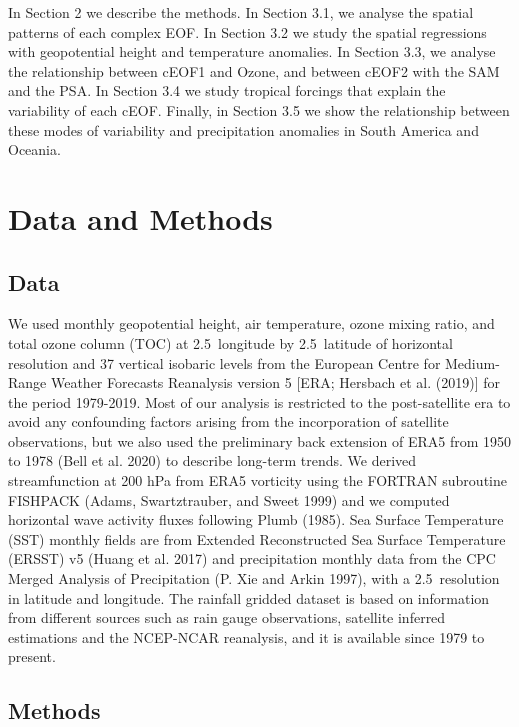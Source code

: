 \documentclass[smallextended]{svjour3}       %
\begin{document}
In Section 2 we describe the methods.
In Section 3.1, we analyse the spatial patterns of each complex EOF.
In Section 3.2 we study the spatial regressions with geopotential height and temperature anomalies.
In Section 3.3, we analyse the relationship between cEOF1 and Ozone, and between cEOF2 with the SAM and the PSA.
In Section 3.4 we study tropical forcings that explain the variability of each cEOF.
Finally, in Section 3.5 we show the relationship between these modes of variability and precipitation anomalies in South America and Oceania.

\hypertarget{methods}{%
\section{Data and Methods}\label{methods}}

\hypertarget{data}{%
\subsection{Data}\label{data}}

We used monthly geopotential height, air temperature, ozone mixing ratio, and total ozone column (TOC) at 2.5\degree~longitude by 2.5\degree~latitude of horizontal resolution and 37 vertical isobaric levels from the European Centre for Medium-Range Weather Forecasts Reanalysis version 5 {[}ERA; Hersbach et al. (2019){]} for the period 1979-2019.
Most of our analysis is restricted to the post-satellite era to avoid any confounding factors arising from the incorporation of satellite observations, but we also used the preliminary back extension of ERA5 from 1950 to 1978 (Bell et al. 2020) to describe long-term trends.
We derived streamfunction at 200 hPa from ERA5 vorticity using the FORTRAN subroutine FISHPACK (Adams, Swartztrauber, and Sweet 1999) and we computed horizontal wave activity fluxes following Plumb (1985).
Sea Surface Temperature (SST) monthly fields are from Extended Reconstructed Sea Surface Temperature (ERSST) v5 (Huang et al. 2017) and precipitation monthly data from the CPC Merged Analysis of Precipitation (P. Xie and Arkin 1997), with a 2.5\degree~resolution in latitude and longitude.
The rainfall gridded dataset is based on information from different sources such as rain gauge observations, satellite inferred estimations and the NCEP-NCAR reanalysis, and it is available since 1979 to present.

\hypertarget{methods-1}{%
\subsection{Methods}\label{methods-1}}
\end{document}
